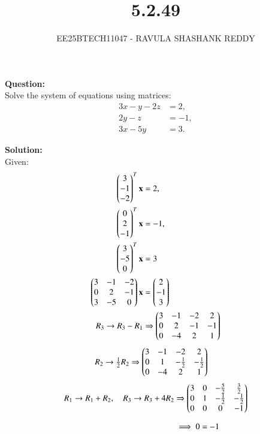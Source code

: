 \documentclass[journal]{article}
\begin{document}
	
	
	\vspace{3cm}
	
\title{5.2.49}
\author{EE25BTECH11047 - RAVULA SHASHANK REDDY}
\maketitle
\hrulefill
\bigskip 

\renewcommand{\thetable}{\theenumi}
\setlength{\intextsep}{10pt}

\textbf{Question:} \\

Solve the system of equations using matrices:
\begin{align*}
3x - y - 2z &= 2, \\
2y - z &= -1, \\
3x - 5y &= 3.
\end{align*}

\textbf{Solution:}\\

Given:
\begin{align}
\begin{pmatrix}3\\-1\\-2\end{pmatrix}^{T}\mathbf{x}&=2,\\
\begin{pmatrix}0\\2\\-1\end{pmatrix}^{T}\mathbf{x}&=-1,\\
\begin{pmatrix}3\\-5\\0\end{pmatrix}^{T}\mathbf{x}&=3\\
\begin{pmatrix}3 & -1 & -2  \\
0 & 2 & -1  \\
3 & -5 & 0 \end{pmatrix} \mathbf{x} &= \begin{pmatrix}2 \\ -1 \\ 3\end{pmatrix}\\
R_3\rightarrow R_3-R_1 &\Rightarrow
\begin{pmatrix}3 & -1 & -2 & 2 \\
0 & 2 & -1 & -1 \\
0 & -4 & 2 & 1\end{pmatrix}
\end{align}
\begin{align}
R_2\rightarrow \tfrac{1}{2}R_2 &\Rightarrow
\begin{pmatrix}3 & -1 & -2 & 2 \\
0 & 1 & -\tfrac{1}{2} & -\tfrac{1}{2} \\
0 & -4 & 2 & 1\end{pmatrix}
\end{align}
\begin{align}
R_1\rightarrow R_1+R_2,\quad R_3\rightarrow R_3+4R_2 &\Rightarrow
\begin{pmatrix}3 & 0 & -\tfrac{5}{2} & \tfrac{3}{2} \\
0 & 1 & -\tfrac{1}{2} & -\tfrac{1}{2} \\
0 & 0 & 0 & -1\end{pmatrix}
\\[6pt]
&\implies 0=-1
\end{align}
\end{document}
